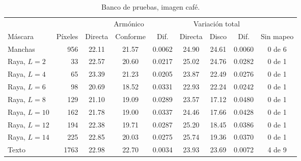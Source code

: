 \begin{table}[ht]
  \centering
  \caption{Banco de pruebas, imagen café.}
  \label{tab:anexo-cafe}
  \small
  \begin{tabular}{@{}lrccccccc@{}}
    \toprule
    & & \multicolumn{3}{c}{Armónico} & \multicolumn{3}{c}{Variación total} & \\
    \cmidrule(lr){3-5}\cmidrule(lr){6-8}
    Máscara & Píxeles & Directa & Conforme & Dif. & Directa & Disco & Dif. & Sin mapeo \\
    \midrule
    Manchas & 956 & 22.11 & 21.57 & 0.0062 & 24.90 & 24.61 & 0.0060 & 0 de 6 \\
    Raya, $L=2$ & 33 & 22.57 & 20.60 & 0.0217 & 25.02 & 24.76 & 0.0282 & 0 de 1 \\
    Raya, $L=4$ & 65 & 23.39 & 21.23 & 0.0205 & 23.87 & 22.49 & 0.0276 & 0 de 1 \\
    Raya, $L=6$ & 98 & 20.69 & 18.52 & 0.0331 & 22.93 & 22.24 & 0.0242 & 0 de 1 \\
    Raya, $L=8$ & 129 & 21.10 & 19.09 & 0.0289 & 23.57 & 17.12 & 0.0480 & 0 de 1 \\
    Raya, $L=10$ & 162 & 21.78 & 19.00 & 0.0337 & 24.46 & 17.66 & 0.0428 & 0 de 1 \\
    Raya, $L=12$ & 194 & 22.38 & 19.71 & 0.0287 & 25.20 & 18.45 & 0.0386 & 0 de 1 \\
    Raya, $L=14$ & 225 & 22.85 & 20.03 & 0.0275 & 25.74 & 19.36 & 0.0370 & 0 de 1 \\
    Texto & 1763 & 22.98 & 22.70 & 0.0034 & 23.93 & 23.69 & 0.0072 & 4 de 9 \\
    \bottomrule
  \end{tabular}
  \propia
\end{table}

